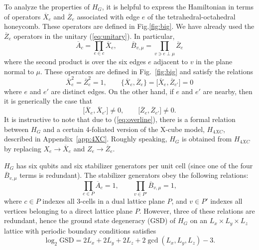 \documentclass[prx,twocolumn,superscriptaddress,nofootinbib,showpacs,notitlepage]{revtex4-2}
\begin{document}
To analyze the properties of $H_G$, it is helpful to express the Hamiltonian in terms of operators $\overline{X}_e$ and $\overline{Z}_e$ associated with edge $e$ of the tetrahedral-octahedral honeycomb. These operators are defined in Fig.\ref{fig:big}. We have already used the $\overline{Z}_e$ operators in the unitary (\ref{eq:unitary}). In particular,
\begin{equation}
    \overline{A}_c=\prod_{e\in c}\overline{X}_e,\qquad \overline{B}_{v,\mu}=\prod_{v\ni e\perp\mu}\overline{Z}_e
    \label{eq:overline}
\end{equation}
where the second product is over the six edges $e$ adjacent to $v$ in the plane normal to $\mu$. These operators are defined in Fig.~\ref{fig:big} and satisfy the relations
\begin{equation}
    \overline{X}_e^2=\overline{Z}_e^2=1,\qquad
    \Big\{\overline{X}_e,\overline{Z}_e\Big\}=\Big[\overline{X}_e,\overline{Z}_{e'}\Big]=0
    \label{eq:relationsHG}
\end{equation}
where $e$ and $e'$ are distinct edges. On the other hand, if $e$ and $e'$ are nearby, then it is generically the case that
\begin{equation}
    \Big[\overline{X}_e,\overline{X}_{e'}\Big]\neq0,\qquad\Big[\overline{Z}_e,\overline{Z}_{e'}\Big]\neq0.
    \label{eq:relationsHG2}
\end{equation}
It is instructive to note that due to (\ref{eq:overline}), there is a formal relation between $H_G$ and a certain 4-foliated version of the X-cube model, $H_{4XC}$, described in Appendix~\ref{app:4XC}. Roughly speaking, $H_G$ is obtained from $H_{4XC}$ by replacing $X_e\to\overline{X}_e$ and $Z_e\to\overline{Z}_e$.

$H_G$ has six qubits and six stabilizer generators per unit cell (since one of the four $\overline{B}_{v,\mu}$ terms is redundant). The stabilizer generators obey the following relations:
\begin{equation}
    \prod_{c\in P}\overline{A}_c=1,\qquad\prod_{v\in P'}\overline{B}_{v,\mu}=1,
\end{equation}
where $c\in P$ indexes all 3-cells in a dual lattice plane $P$, and $v\in P'$ indexes all vertices belonging to a direct lattice plane $P$. However, three of these relations are redundant, hence the ground state degeneracy (GSD) of $H_G$ on an $L_x\times L_y\times L_z$ lattice with periodic boundary conditions satisfies
\begin{equation}
    \log_2\text{GSD}=2L_x+2L_y+2L_z+2\gcd(L_x,L_y,L_z)-3.
    \label{eq:GSD2}
\end{equation}
\end{document}
